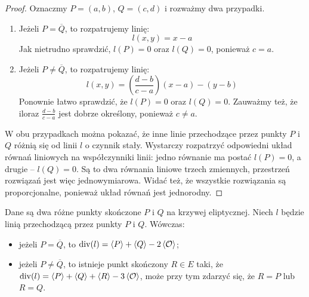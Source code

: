 \begin{proof}
Oznaczmy $P = (a, b)$, $Q = (c, d)$ i rozważmy dwa przypadki.
\begin{enumerate}
\item
Jeżeli $P = \overline{Q}$,
to rozpatrujemy linię:
\begin{equation}
l(x, y) = x - a
\end{equation}
Jak nietrudno sprawdzić, $l(P) = 0$ oraz $l(Q) = 0$,
ponieważ $c = a$.
\item
Jeżeli $P \neq \overline{Q}$,
to rozpatrujemy linię:
\begin{equation}
l(x, y) = \left(\frac{d-b}{c-a}\right)(x - a) - (y - b)
\end{equation}
Ponownie łatwo sprawdzić, że $l(P) = 0$ oraz $l(Q) = 0$.
Zauważmy też,
że iloraz $\frac{d-b}{c-a}$ jest dobrze określony,
ponieważ $c \neq a$.
\end{enumerate}

\noindent
W obu przypadkach można pokazać, że inne linie
przechodzące przez punkty $P$ i $Q$ różnią się od linii $l$ o czynnik stały.
Wystarczy rozpatrzyć odpowiedni układ równań liniowych
na współczynniki linii:
jedno równanie ma postać $l(P) = 0$, a drugie -- $l(Q) = 0$.
Są to dwa równania liniowe trzech zmiennych,
przestrzeń rozwiązań jest więc jednowymiarowa.
Widać też, że wszystkie rozwiązania są proporcjonalne,
ponieważ układ równań jest jednorodny.
\end{proof}

\begin{theorem}
Dane są dwa różne punkty skończone $P$ i $Q$ na krzywej eliptycznej.
Niech $l$ będzie linią przechodzącą przez punkty $P$ i $Q$.
Wówczas:
\begin{itemize}
\item jeżeli $P = \overline{Q}$,
to $\operatorname{div}(l) = \left\langle P\right\rangle + \left\langle Q\right\rangle - 2\left\langle\mathcal{O}\right\rangle$;
\item jeżeli $P \neq \overline{Q}$,
to istnieje punkt skończony $R \in E$ taki,
że $\operatorname{div}(l) = \left\langle P\right\rangle + \left\langle Q\right\rangle + \left\langle R\right\rangle - 3\left\langle\mathcal{O}\right\rangle$,
może przy tym zdarzyć się, że $R = P$ lub $R = Q$.
\end{itemize}
\end{theorem}

